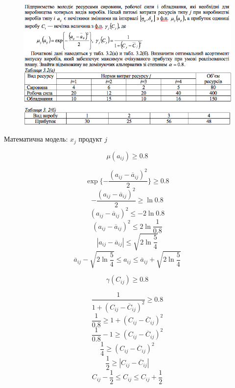 \begin{center}
  \normalsize{}
\end{center}

\begin{figure}[h!]
  \centering
  \includegraphics[width=13.8cm]{3_2.png}
  \centering
\end{figure}

Математична модель: $x_{j}$ продукт $j$

\begin{multicols}{2}
  $$\mu(a_{ij}) \geqslant 0.8  $$

  $$ \exp\{ - \dfrac{(a_{ij}-\overline{a}_{ij})^2}{2} \} \geqslant 0.8 $$
  $$- \dfrac{(a_{ij}-\overline{a}_{ij})^2}{2} \geqslant \ln{0.8} $$
  $$ (a_{ij}-\overline{a}_{ij})^2 \leqslant -2 \ln{0.8} $$
  $$ (a_{ij}-\overline{a}_{ij})^2 \leqslant 2 \ln{\dfrac{1}{0.8}} $$
  $$|a_{ij}-\overline{a}_{ij}| \leqslant \sqrt{2\ln{\dfrac{5}{4}}} $$
  $$ \overline{a}_{ij} - \sqrt{2 \ln{\dfrac{5}{4}}} \leqslant a_{ij} \leqslant \overline{a}_{ij} + \sqrt{ 2 \ln{\dfrac{5}{4}}}$$


  \columnbreak
  $$\gamma(C_{ij}) \geqslant 0.8 $$

  $$\dfrac{1}{1+(C_{ij}-\overline{C}_{ij})^2} \geqslant 0.8$$
  $$\dfrac{1}{0.8} \geqslant 1+(C_{ij}-\overline{C}_{ij})^2$$
  $$\dfrac{1}{0.8} - 1 \geqslant (C_{ij}-\overline{C}_{ij})^2$$
  $$\dfrac{1}{4} \geqslant (C_{ij}-\overline{C}_{ij})^2$$
  $$\dfrac{1}{2} \geqslant |C_{ij}-\overline{C}_{ij}|$$
  $$C_{ij} - \dfrac{1}{2} \leqslant C_{ij} \leqslant C_{ij} + \dfrac{1}{2}$$

\end{multicols}



